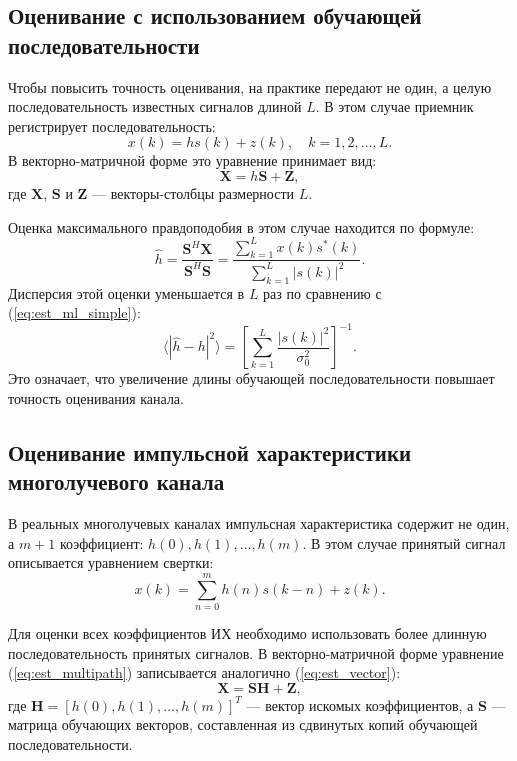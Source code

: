 \subsection{Оценивание с использованием обучающей последовательности}

Чтобы повысить точность оценивания, на практике передают не один, а целую последовательность известных сигналов длиной $L$. В этом случае приемник регистрирует последовательность:
\begin{equation}
    x(k) = h s(k) + z(k), \quad k = 1, 2, \dots, L.
\end{equation}
В векторно-матричной форме это уравнение принимает вид:
\begin{equation}
    \mathbf{X} = h \mathbf{S} + \mathbf{Z},
    \label{eq:est_vector}
\end{equation}
где $\mathbf{X}$, $\mathbf{S}$ и $\mathbf{Z}$ --- векторы-столбцы размерности $L$.

Оценка максимального правдоподобия в этом случае находится по формуле:
\begin{equation}
    \hat{h} = \frac{\mathbf{S}^H \mathbf{X}}{\mathbf{S}^H \mathbf{S}} = \frac{\sum_{k=1}^L x(k) s^*(k)}{\sum_{k=1}^L |s(k)|^2}.
    \label{eq:est_ml_seq}
\end{equation}
Дисперсия этой оценки уменьшается в $L$ раз по сравнению с (\ref{eq:est_ml_simple}):
\begin{equation}
    \langle |\hat{h} - h|^2 \rangle = \left[ \sum_{k=1}^L \frac{|s(k)|^2}{\sigma_0^2} \right]^{-1}.
    \label{eq:est_variance}
\end{equation}
Это означает, что увеличение длины обучающей последовательности повышает точность оценивания канала.

\subsection{Оценивание импульсной характеристики многолучевого канала}

В реальных многолучевых каналах импульсная характеристика содержит не один, а $m+1$ коэффициент: $h(0), h(1), \dots, h(m)$. В этом случае принятый сигнал описывается уравнением свертки:
\begin{equation}
    x(k) = \sum_{n=0}^{m} h(n) s(k - n) + z(k).
    \label{eq:est_multipath}
\end{equation}

Для оценки всех коэффициентов ИХ необходимо использовать более длинную последовательность принятых сигналов. В векторно-матричной форме уравнение (\ref{eq:est_multipath}) записывается аналогично (\ref{eq:est_vector}):
\begin{equation}
    \mathbf{X} = \mathbf{S} \mathbf{H} + \mathbf{Z},
    \label{eq:est_matrix_form}
\end{equation}
где $\mathbf{H} = [h(0), h(1), \dots, h(m)]^T$ --- вектор искомых коэффициентов, а $\mathbf{S}$ --- матрица обучающих векторов, составленная из сдвинутых копий обучающей последовательности.

